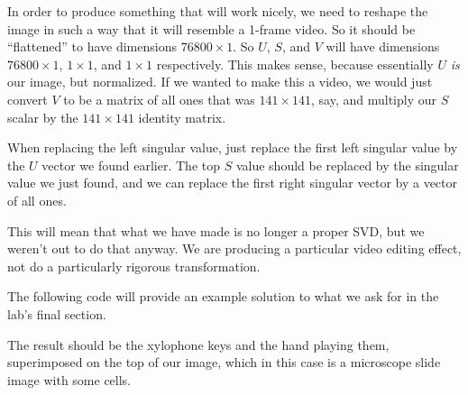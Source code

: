 In order to produce something that will work nicely, we need to reshape the image in such a way that it will resemble a 1-frame video. So it should be ``flattened'' to have dimensions $76800 \times 1$. So $U$, $S$, and $V$ will have dimensions $76800 \times 1$, $1 \times 1$, and $1 \times 1$ respectively. This makes sense, because essentially $U$ \textit{is} our image, but normalized. If we wanted to make this a video, we would just convert $V$ to be a matrix of all ones that was $141 \times 141$, say, and multiply our $S$ scalar by the $141 \times 141$ identity matrix.

When replacing the left singular value, just replace the first left singular value by the $U$ vector we found earlier. The top $S$ value should be replaced by the singular value we just found, and we can replace the first right singular vector by a vector of all ones.

This will mean that what we have made is no longer a proper SVD, but we weren't out to do that anyway. We are producing a particular video editing effect, not do a particularly rigorous transformation.

The following code will provide an example solution to what we ask for in the lab's final section.


The result should be the xylophone keys and the hand playing them, superimposed on the top of our image, which in this case is a microscope slide image with some cells.